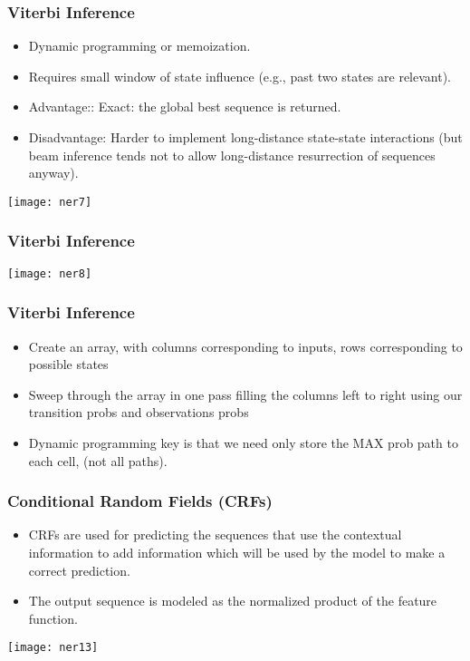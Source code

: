 \begin{frame}[fragile]\frametitle{Viterbi Inference}
  \begin{itemize}
  \item Dynamic programming or memoization.
  \item Requires small window of state influence (e.g., past two states are relevant).
  \item Advantage:: Exact: the global best sequence is returned.
  \item Disadvantage: Harder to implement long-distance state-state interactions (but beam inference tends not
to allow long-distance resurrection of sequences anyway).
  \end{itemize}
\begin{center}
\texttt{[image: ner7]}
\end{center}
\end{frame}

\begin{frame}[fragile]\frametitle{Viterbi Inference}
\begin{center}
\texttt{[image: ner8]}
\end{center}
\end{frame}

\begin{frame}[fragile]\frametitle{Viterbi Inference}
  \begin{itemize}
  \item Create an array, with columns corresponding to inputs, rows corresponding to possible states
  \item Sweep through the array in one pass filling the columns left to right using our transition probs and observations probs
  \item Dynamic programming key is that we need only store the MAX prob path to each cell, (not all paths).
  \end{itemize}
\end{frame}

\begin{frame}[fragile]\frametitle{Conditional Random Fields (CRFs)}
  \begin{itemize}
  \item CRFs are used for predicting the sequences that use the contextual information to add information which will be used by the model to make a correct prediction.
	\item The output sequence is modeled as the normalized product of the feature function.
  \end{itemize}
	
	\begin{center}
\texttt{[image: ner13]}
\end{center}
\end{frame}


